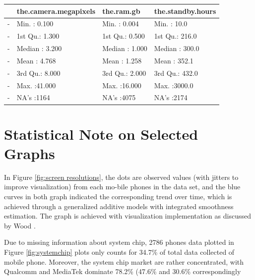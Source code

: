 \documentclass[utf8,english]{gradu3}
\begin{document}
\begin{table}[ht]
\centering
\begin{tabular}{rlll}
  \hline
 & the.camera.megapixels &   the.ram.gb & the.standby.hours \\ 
  \hline
- & Min.   : 0.100   & Min.   : 0.004   & Min.   :  10.0   \\ 
  - & 1st Qu.: 1.300   & 1st Qu.: 0.500   & 1st Qu.: 216.0   \\ 
  - & Median : 3.200   & Median : 1.000   & Median : 300.0   \\ 
  - & Mean   : 4.768   & Mean   : 1.258   & Mean   : 352.1   \\ 
  - & 3rd Qu.: 8.000   & 3rd Qu.: 2.000   & 3rd Qu.: 432.0   \\ 
  - & Max.   :41.000   & Max.   :16.000   & Max.   :3000.0   \\ 
  - & NA's   :1164   & NA's   :4075   & NA's   :2174   \\ 
   \hline
\end{tabular}
\end{table}

\section{Statistical Note on Selected Graphs}
\label{app:stats note}

In Figure \ref{fig:screen resolutions}, the dots are observed values (with jitters to improve visualization) from each mo-bile phones in the data set, and the blue curves in both graph indicated the corresponding trend over time, which is achieved through a generalized additive models with integrated smoothness estimation. The graph is achieved with visualization implementation as discussed by Wood \citeyear{wood2001mgcv}.

Due to missing information about system chip, 2786 phones data plotted in Figure \ref{fig:systemchip} plots only counts for 34.7\% of total data collected of mobile phone. Moreover, the system chip market are rather concentrated, with Qualcomm and MediaTek dominate 78.2\% (47.6\% and 30.6\% correspondingly
\end{document}
